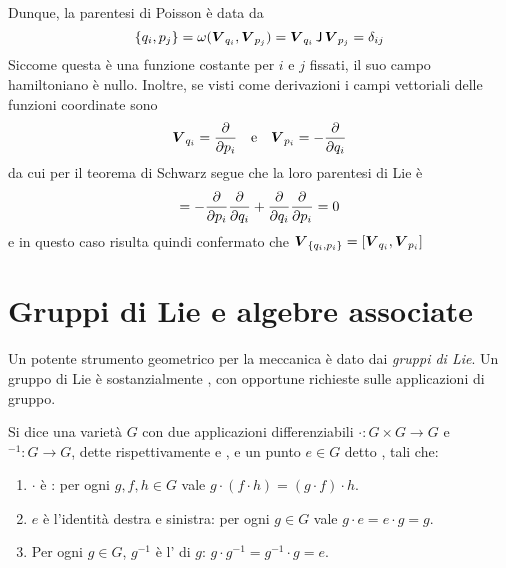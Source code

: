 Dunque, la parentesi di Poisson è data da
\begin{equation*}
\pb{q_i}{p_j} = \omega(\vec{V}_{q_i}, \vec{V}_{p_j}) = \vec{V}_{q_i}\, \mathsf{J}\, \vec{V}_{p_j} = \delta_{ij}
\end{equation*}
Siccome questa è una funzione costante per $i$ e $j$ fissati, il suo campo hamiltoniano è nullo. Inoltre, se visti come derivazioni i campi vettoriali delle funzioni coordinate sono 
\begin{equation*}
\vec{V}_{q_i} = \pdv{p_i} \qqtext{e} \vec{V}_{p_i} = -\pdv{q_i}
\end{equation*}
da cui per il teorema di Schwarz segue che la loro parentesi di Lie è 
\begin{equation*}
[V_{q_i}, V_{p_i}] = -\pdv{p_i}\pdv{q_i} + \pdv{q_i}\pdv{p_i} = 0
\end{equation*}
e in questo caso risulta quindi confermato che $\vec{V}_{\pb{q_i}{p_i}} = [\vec{V}_{q_i}, \vec{V}_{p_i}]$

\section{Gruppi di Lie e algebre associate}
Un potente strumento geometrico per la meccanica è dato dai \emph{gruppi di Lie}. Un gruppo di Lie è sostanzialmente , con opportune richieste sulle applicazioni di gruppo.
\begin{definition}
  Si dice  una varietà $G$ con due applicazioni differenziabili $\cdot: G \times G \to G$ e ${}^{-1}: G\to G$, dette rispettivamente  e , e un punto $e \in G$ detto , tali che:
  \begin{enumerate}
    \item $\cdot $ è : per ogni $g,f,h \in G$ vale $g\cdot (f\cdot h) = (g\cdot f) \cdot h$.
    \item $e$ è l'identità destra e sinistra: per ogni $g \in G$ vale $g \cdot e = e \cdot g = g$.
    \item Per ogni $g \in G$, $g^{-1}$ è l' di $g$: $g \cdot g^{-1} = g^{-1}\cdot g = e$.
  \end{enumerate}
\end{definition}

